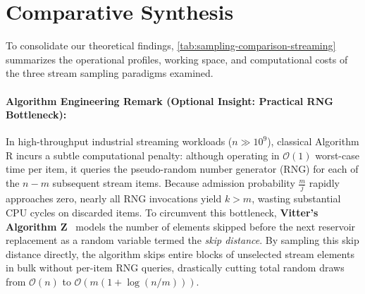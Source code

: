 \FloatBarrier
\FloatBarrier
\section{Comparative Synthesis}
\label{sec:comparative-synthesis}

To consolidate our theoretical findings, \autoref{tab:sampling-comparison-streaming} summarizes the operational profiles, working space, and computational costs of the three stream sampling paradigms examined.

\begin{table}[H]
  \centering
  \caption{Comparative synthesis of stream sampling strategies.}
  \label{tab:sampling-comparison-streaming}
\end{table}

\paragraph{Algorithm Engineering Remark (Optional Insight: Practical RNG Bottleneck):}
In high-throughput industrial streaming workloads ($n \gg 10^9$), classical Algorithm R incurs a subtle computational penalty: although operating in $\mathcal{O}(1)$ worst-case time per item, it queries the pseudo-random number generator (RNG) for each of the $n - m$ subsequent stream items. Because admission probability $\frac{m}{j}$ rapidly approaches zero, nearly all RNG invocations yield $k > m$, wasting substantial CPU cycles on discarded items.
To circumvent this bottleneck, \textbf{Vitter's Algorithm Z}~\cite{vitter1985} models the number of elements skipped before the next reservoir replacement as a random variable termed the \emph{skip distance}. By sampling this skip distance directly, the algorithm skips entire blocks of unselected stream elements in bulk without per-item RNG queries, drastically cutting total random draws from $\mathcal{O}(n)$ to $\mathcal{O}(m(1 + \log(n/m)))$.
